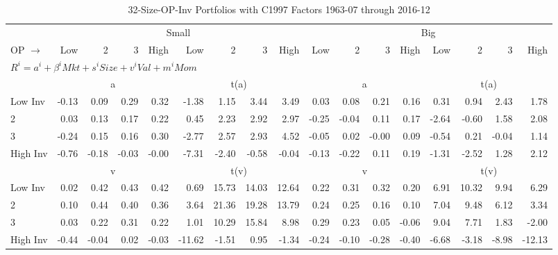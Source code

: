 
\begin{table}[!ht]
\centering
\caption{32-Size-OP-Inv Portfolios with C1997 Factors 1963-07 through 2016-12}
\begin{tabular}{lrrrrrrrrrrrrrrrr}
  \toprule
    & \multicolumn{8}{c}{Small} & \multicolumn{8}{c}{Big} \\
      \cmidrule(r){2-9} \cmidrule(r){10-17}
    OP $\rightarrow$ & Low & 2 & 3 & High & Low & 2 & 3 & High & Low & 2 & 3 & High & Low & 2 & 3 & High \\ 
  \midrule
  \multicolumn{17}{l}{$R^i=a^i+\beta^iMkt+s^iSize+v^iVal+m^iMom$} \\

  
    
      & \multicolumn{4}{c}{a} & \multicolumn{4}{c}{t(a)}
    
      & \multicolumn{4}{c}{a} & \multicolumn{4}{c}{t(a)}
    
    \\
      \cmidrule(r){2-5} \cmidrule(r){6-9} \cmidrule(r){10-13} \cmidrule(r){14-17}

    Low Inv   & -0.13  & 0.09  & 0.29  & 0.32  & -1.38  & 1.15  & 3.44  & 3.49  & 0.03  & 0.08  & 0.21  & 0.16  & 0.31  & 0.94  & 2.43  & 1.78  \\
           2  & 0.03  & 0.13  & 0.17  & 0.22  & 0.45  & 2.23  & 2.92  & 2.97  & -0.25  & -0.04  & 0.11  & 0.17  & -2.64  & -0.60  & 1.58  & 2.08  \\
           3  & -0.24  & 0.15  & 0.16  & 0.30  & -2.77  & 2.57  & 2.93  & 4.52  & -0.05  & 0.02  & -0.00  & 0.09  & -0.54  & 0.21  & -0.04  & 1.14  \\
    High Inv  & -0.76  & -0.18  & -0.03  & -0.00  & -7.31  & -2.40  & -0.58  & -0.04  & -0.13  & -0.22  & 0.11  & 0.19  & -1.31  & -2.52  & 1.28  & 2.12  \\

  
    
      & \multicolumn{4}{c}{v} & \multicolumn{4}{c}{t(v)}
    
      & \multicolumn{4}{c}{v} & \multicolumn{4}{c}{t(v)}
    
    \\
      \cmidrule(r){2-5} \cmidrule(r){6-9} \cmidrule(r){10-13} \cmidrule(r){14-17}

    Low Inv   & 0.02  & 0.42  & 0.43  & 0.42  & 0.69  & 15.73  & 14.03  & 12.64  & 0.22  & 0.31  & 0.32  & 0.20  & 6.91  & 10.32  & 9.94  & 6.29  \\
           2  & 0.10  & 0.44  & 0.40  & 0.36  & 3.64  & 21.36  & 19.28  & 13.79  & 0.24  & 0.25  & 0.16  & 0.10  & 7.04  & 9.48  & 6.12  & 3.34  \\
           3  & 0.03  & 0.22  & 0.31  & 0.22  & 1.01  & 10.29  & 15.84  & 8.98  & 0.29  & 0.23  & 0.05  & -0.06  & 9.04  & 7.71  & 1.83  & -2.00  \\
    High Inv  & -0.44  & -0.04  & 0.02  & -0.03  & -11.62  & -1.51  & 0.95  & -1.34  & -0.24  & -0.10  & -0.28  & -0.40  & -6.68  & -3.18  & -8.98  & -12.13  \\


\end{tabular}
\end{table}
